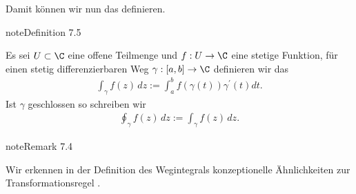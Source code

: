 \documentclass[letterpaper,10pt,german]{jupyterBook}
\begin{document}
\sphinxAtStartPar
Damit können wir nun das  definieren.
\label{complexanalysis/kurvenintegrale:definition-3}
\begin{sphinxadmonition}{note}{Definition 7.5}



\sphinxAtStartPar
Es sei \(U\subset\C\) eine offene Teilmenge und \(f:U\to\C\) eine stetige Funktion, für einen stetig differenzierbaren Weg \(\gamma:[a,b]\to\C\) definieren wir das 
\begin{equation*}
\begin{split}\int_\gamma f(z)\, dz := \int_a^b f(\gamma(t))\gamma^\prime(t)dt.\end{split}
\end{equation*}
\sphinxAtStartPar
Ist \(\gamma\) geschlossen so schreiben wir
\begin{equation*}
\begin{split}\oint_\gamma f(z)\, dz:=\int_\gamma f(z)\, dz.\end{split}
\end{equation*}\end{sphinxadmonition}
\label{complexanalysis/kurvenintegrale:remark-4}
\begin{sphinxadmonition}{note}{Remark 7.4}



\sphinxAtStartPar
Wir erkennen in der Definition des Wegintegrals konzeptionelle Ähnlichkeiten zur Transformationsregel {\hyperref[\detokenize{masstheorie/integrationstechnik:thm:jacobitransformation}]{}}.
\end{sphinxadmonition}
\end{document}
